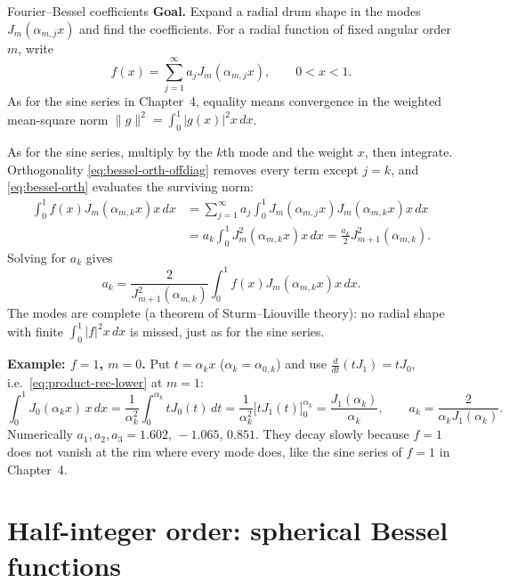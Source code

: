 \documentclass[11pt]{beamer}
\begin{document}
\begin{frame}[allowframebreaks=1.00]{Fourier--Bessel coefficients}
\footnotesize
\textbf{Goal.} Expand a radial drum shape in the modes \(J_m(\alpha_{m,j}x)\) and find the coefficients.
For a radial function of fixed angular order $m$, write
\begin{equation}
 f(x)=\sum_{j=1}^{\infty}a_jJ_m(\alpha_{m,j}x),\qquad 0<x<1.
 \label{eq:fourier-bessel}
\end{equation}
As for the sine series in Chapter~4, equality means convergence in the weighted
mean-square norm $\|g\|^2=\int_0^1|g(x)|^2x\,dx$.

As for the sine series, multiply by the $k$th mode and the weight $x$,
then integrate. Orthogonality \eqref{eq:bessel-orth-offdiag} removes every term except $j=k$,
and \eqref{eq:bessel-orth} evaluates the surviving norm:
\begin{align*}
 \int_0^1 f(x)J_m(\alpha_{m,k}x)x\,dx
 &=\sum_{j=1}^{\infty}a_j\int_0^1J_m(\alpha_{m,j}x)J_m(\alpha_{m,k}x)x\,dx\\
 &=a_k\int_0^1J_m^2(\alpha_{m,k}x)x\,dx
 =\frac{a_k}{2}J_{m+1}^2(\alpha_{m,k}).
\end{align*}
Solving for $a_k$ gives
\begin{equation}
 a_k=\frac{2}{J_{m+1}^2(\alpha_{m,k})}
       \int_0^1f(x)J_m(\alpha_{m,k}x)x\,dx.
 \label{eq:fourier-bessel-coeff}
\end{equation}
The modes are complete (a theorem of Sturm--Liouville theory): no radial shape with finite
$\int_0^1|f|^2x\,dx$ is missed, just as for the sine series.

\textbf{Example: $f=1$, $m=0$.} Put $t=\alpha_kx$ ($\alpha_k=\alpha_{0,k}$) and use
$\frac{d}{dt}(tJ_1)=tJ_0$, i.e.\ \eqref{eq:product-rec-lower} at $m=1$:
\[
 \int_0^1J_0(\alpha_kx)\,x\,dx=\frac1{\alpha_k^2}\int_0^{\alpha_k}tJ_0(t)\,dt
 =\frac{1}{\alpha_k^2}\bigl[tJ_1(t)\bigr]_0^{\alpha_k}=\frac{J_1(\alpha_k)}{\alpha_k},
 \qquad
 a_k=\frac{2}{\alpha_kJ_1(\alpha_k)}.
\]
Numerically $a_1,a_2,a_3=1.602,\,-1.065,\,0.851$. They decay slowly because $f=1$ does not
vanish at the rim where every mode does, like the sine series of $f=1$ in Chapter~4.
\end{frame}

\section{Half-integer order: spherical Bessel functions}
\end{document}

